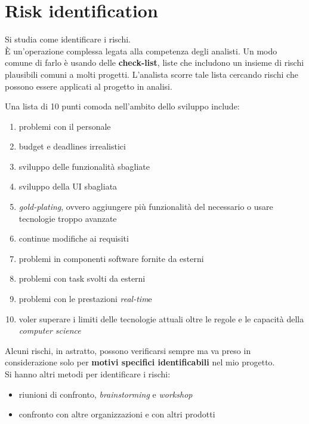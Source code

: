 \documentclass[a4paper,12pt, oneside]{book}
\begin{document}
\section{Risk identification}
Si studia come identificare i rischi.\\
È un'operazione complessa legata alla competenza degli analisti. Un modo comune
di farlo è usando delle \textbf{check-list}, liste che includono un insieme di
rischi plausibili comuni a molti progetti. L'analista scorre tale lista cercando
rischi che possono essere applicati al progetto in analisi.
\begin{esempio}
  Una lista di 10 punti comoda nell'ambito dello sviluppo include:
  \begin{enumerate}
    \item problemi con il personale
    \item budget e deadlines irrealistici
    \item sviluppo delle funzionalità sbagliate
    \item sviluppo della UI sbagliata
    \item \textit{gold-plating}, ovvero aggiungere più funzionalità del
    necessario o usare tecnologie troppo avanzate
    \item continue modifiche ai requisiti
    \item problemi in componenti software fornite da esterni
    \item problemi con task svolti da esterni
    \item problemi con le prestazioni \textit{real-tim}e
    \item voler superare i limiti delle tecnologie attuali oltre le regole e le
    capacità della \textit{computer science}
  \end{enumerate}
\end{esempio}
Alcuni rischi, in astratto, possono verificarsi sempre ma va preso in
considerazione solo per\textbf{ motivi specifici identificabili} nel mio
progetto.\\ 
Si hanno altri metodi per identificare i rischi:
\begin{itemize}
  \item riunioni di confronto, \textit{brainstorming} e \textit{workshop}
  \item confronto con altre organizzazioni e con altri prodotti
\end{itemize}
\end{document}
